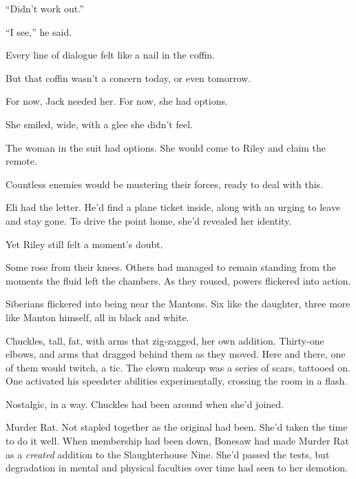 ``Didn't work out.''



``I see,'' he said.



Every line of dialogue felt like a nail in the coffin.



But that coffin wasn't a concern today, or even tomorrow.



For now, Jack needed her.  For now, she had options.



She smiled, wide, with a glee she didn't feel.



The woman in the suit had options.  She would come to Riley and claim the remote.



Countless enemies would be mustering their forces, ready to deal with this.



Eli had the letter.  He'd find a plane ticket inside, along with an urging to leave and stay gone.  To drive the point home, she'd revealed her identity.



Yet Riley still felt a moment's doubt.



Some rose from their knees.  Others had managed to remain standing from the moments the fluid left the chambers.  As they roused, powers flickered into action.



Siberians flickered into being near the Mantons.  Six like the daughter, three more like Manton himself, all in black and white.



Chuckles, tall, fat, with arms that zig-zagged, her own addition.  Thirty-one elbows, and arms that dragged behind them as they moved.  Here and there, one of them would twitch, a tic.  The clown makeup was a series of scars, tattooed on.  One activated his speedster abilities experimentally, crossing the room in a flash.



Nostalgic, in a way.  Chuckles had been around when she'd joined.



Murder Rat.  Not stapled together as the original had been.  She'd taken the time to do it well.  When membership had been down, Bonesaw had made Murder Rat as a \emph{created} addition to the Slaughterhouse Nine.  She'd passed the tests, but degradation in mental and physical faculties over time had seen to her demotion.



